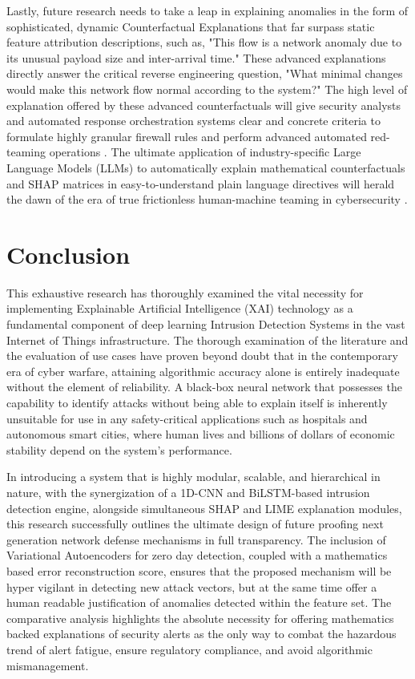 \documentclass[12pt]{article}
\begin{document}
    Lastly, future research needs to take a leap in explaining anomalies in the form of sophisticated, dynamic Counterfactual Explanations that far surpass static feature attribution descriptions, such as, "This flow is a network anomaly due to its unusual payload size and inter-arrival time." These advanced explanations directly answer the critical reverse engineering question, "What minimal changes would make this network flow normal according to the system?" The high level of explanation offered by these advanced counterfactuals will give security analysts and automated response orchestration systems clear and concrete criteria to formulate highly granular firewall rules and perform advanced automated red-teaming operations \cite{frontiers2025ids}. The ultimate application of industry-specific Large Language Models (LLMs) to automatically explain mathematical counterfactuals and SHAP matrices in easy-to-understand plain language directives will herald the dawn of the era of true frictionless human-machine teaming in cybersecurity \cite{mdpi2025industry5}.

    \section{Conclusion}
    This exhaustive research has thoroughly examined the vital necessity for implementing Explainable Artificial Intelligence (XAI) technology as a fundamental component of deep learning Intrusion Detection Systems in the vast Internet of Things infrastructure. The thorough examination of the literature and the evaluation of use cases have proven beyond doubt that in the contemporary era of cyber warfare, attaining algorithmic accuracy alone is entirely inadequate without the element of reliability. A black-box neural network that possesses the capability to identify attacks without being able to explain itself is inherently unsuitable for use in any safety-critical applications such as hospitals and autonomous smart cities, where human lives and billions of dollars of economic stability depend on the system's performance.

    In introducing a system that is highly modular, scalable, and hierarchical in nature, with the synergization of a 1D-CNN and BiLSTM-based intrusion detection engine, alongside simultaneous SHAP and LIME explanation modules, this research successfully outlines the ultimate design of future proofing next generation network defense mechanisms in full transparency. The inclusion of Variational Autoencoders for zero day detection, coupled with a mathematics based error reconstruction score, ensures that the proposed mechanism will be hyper vigilant in detecting new attack vectors, but at the same time offer a human readable justification of anomalies detected within the feature set. The comparative analysis highlights the absolute necessity for offering mathematics backed explanations of security alerts as the only way to combat the hazardous trend of alert fatigue, ensure regulatory compliance, and avoid algorithmic mismanagement.
\end{document}
